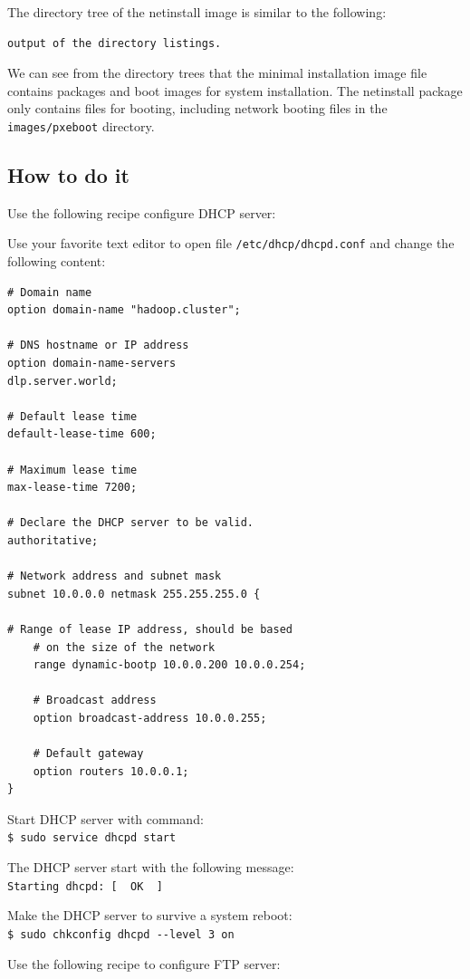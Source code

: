 The directory tree of the netinstall image is similar to the following:
\begin{verbatim}
output of the directory listings.
\end{verbatim}
We can see from the directory trees that the minimal installation image file contains packages and boot images for system installation. The netinstall package only contains files for booting, including network booting files in the \verb|images/pxeboot| directory.

\subsection*{How to do it}
Use the following recipe configure DHCP server:

Use your favorite text editor to open file \verb|/etc/dhcp/dhcpd.conf| and change the following content:
\begin{verbatim}
# Domain name
option domain-name "hadoop.cluster";

# DNS hostname or IP address
option domain-name-servers
dlp.server.world;

# Default lease time
default-lease-time 600;

# Maximum lease time
max-lease-time 7200;

# Declare the DHCP server to be valid.
authoritative;

# Network address and subnet mask
subnet 10.0.0.0 netmask 255.255.255.0 {

# Range of lease IP address, should be based
    # on the size of the network
    range dynamic-bootp 10.0.0.200 10.0.0.254;

    # Broadcast address
    option broadcast-address 10.0.0.255;

    # Default gateway
    option routers 10.0.0.1;
}
\end{verbatim}

Start DHCP server with command: \\
\verb|$ sudo service dhcpd start|

The DHCP server start with the following message: \\
\verb|Starting dhcpd: [  OK  ]|

Make the DHCP server to survive a system reboot: \\
\verb|$ sudo chkconfig dhcpd --level 3 on|

Use the following recipe to configure FTP server: \\

